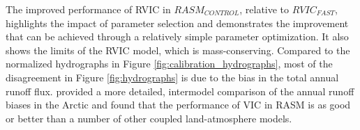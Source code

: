 \begin{table}
  \caption{RVIC model performance statistics for the seven rivers shown in Figure \ref{fig:rasm_domain}. The overlap statistic is calculated using normalized hydrographs whereas the bias and RMSE are calculated using the unadjusted hydrographs.}
  \label{table:rivers}
\end{table}

The improved performance of RVIC in $RASM_{CONTROL}$, relative to $RVIC_{FAST}$, highlights the impact of parameter selection and demonstrates the improvement that can be achieved through a relatively simple parameter optimization.
It also shows the limits of the RVIC model, which is mass-conserving.
Compared to the normalized hydrographs in Figure \ref{fig:calibration_hydrographs}, most of the disagreement in Figure \ref{fig:hydrographs} is due to the bias in the total annual runoff flux.
\citet{Hamman_2016a} provided a more detailed, intermodel comparison of the annual runoff biases in the Arctic and found that the performance of VIC in RASM is as good or better than a number of other coupled land-atmosphere models.

